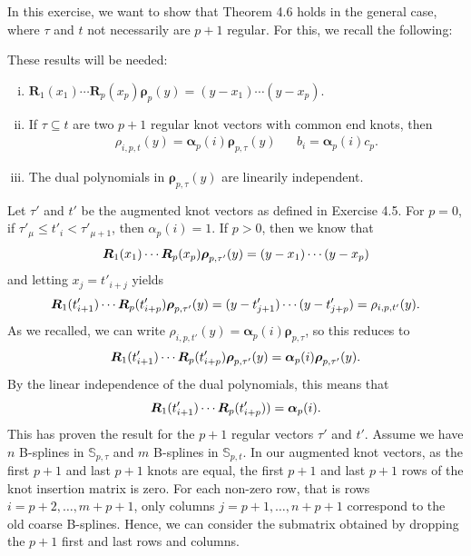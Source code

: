 \documentclass{article}
\renewcommand{\S}{\mathbb{S}}
\newcommand{\R}{\boldsymbol{R}}
\newcommand{\rrho}{\boldsymbol{\rho}}
\newcommand{\aalpha}{\boldsymbol{\alpha}}
\begin{document}
    In this exercise, we want to show that Theorem 4.6 holds in the general
    case, where $\tau$ and $t$ not necessarily are $p+1$ regular. For this, we
    recall the following:
    \begin{recall}
        These results will be needed:     
        \begin{enumerate}[i)]
            \item $\R_1(x_1)\cdots\R_p(x_p)\rrho_p(y) = (y - x_1)\cdots(y-x_p)$.
            \item If $\tau \subseteq t$ are two $p+1$ regular knot vectors with common end knots, then
                \begin{align*}
                    \rho_{i, p, t}(y) = \aalpha_p(i)\rrho_{p, \tau}(y) && b_i = \aalpha_p(i)c_p.
                \end{align*}
            \item The dual polynomials in $\rrho_{p, \tau}(y)$ are linearily
                independent.
        \end{enumerate} 
    \end{recall}
    Let $\tau'$ and $t'$ be the augmented knot vectors as defined in Exercise
    4.5. For $p = 0$, if $\tau'_\mu \leq t'_i < \tau'_{\mu+1}$, then
    $\alpha_{p}(i) = 1$. If $p > 0$, then we know that
    \begin{equation}
        \notag
        \R_1(x_1)\cdots\R_p(x_p)\rrho_{p, \tau'}(y) = (y - x_1)\cdots(y-x_p)
    \end{equation}
    and letting $x_j = t'_{i+j}$ yields
    \begin{equation}
        \notag
        \R_1(t'_{i+1}) \cdots \R_p(t'_{i+p})\rrho_{p, \tau'}(y) = (y -
        t'_{j+1}) \cdots (y - t'_{j+p}) = \rho_{i, p, t'}(y).
    \end{equation}
    As we recalled, we can write $\rho_{i, p, t'}(y) = \aalpha_p(i)\rrho_{p,
    \tau}$, so this reduces to
    \begin{equation}
        \notag
        \R_1(t'_{i+1}) \cdots \R_p(t'_{i+p})\rrho_{p, \tau'}(y)
        =\aalpha_p(i)\rrho_{p, \tau'}(y).
    \end{equation}
    By the linear independence of the dual polynomials, this means that
    \begin{equation}
        \notag
        \R_1(t'_{i+1}) \cdots \R_p(t'_{i+p})) = \aalpha_p(i).
    \end{equation}
    This has proven the result for the $p+1$ regular vectors $\tau'$ and $t'$.
    Assume we have $n$ B-splines in $\S_{p, \tau}$ and $m$ B-splines in $\S_{p,
    t}$. In our augmented knot vectors, as the first $p+1$ and last $p+1$ knots
    are equal, the first $p+1$ and last $p+1$ rows of the knot insertion matrix
    is zero. For each non-zero row, that is rows $i = p+2, \ldots, m+p+1$, only
    columns $j = p+1, \ldots, n+p+1$ correspond to the old coarse B-splines.
    Hence, we can consider the submatrix obtained by dropping the $p+1$ first
    and last rows and columns.
\end{document}
